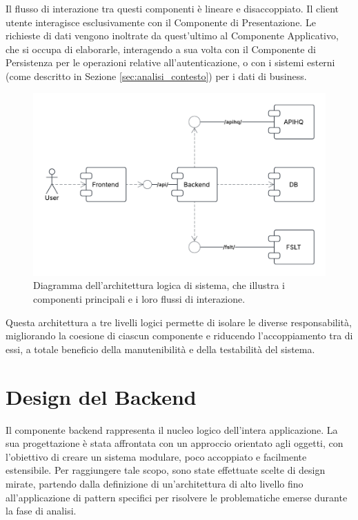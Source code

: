 \documentclass[12pt,a4paper,openright,twoside]{book}
\begin{document}
Il flusso di interazione tra questi componenti è lineare e disaccoppiato. Il client utente interagisce esclusivamente con il Componente di Presentazione. Le richieste di dati vengono inoltrate da quest'ultimo al Componente Applicativo, che si occupa di elaborarle, interagendo a sua volta con il Componente di Persistenza per le operazioni relative all'autenticazione, o con i sistemi esterni (come descritto in Sezione \ref{sec:analisi_contesto}) per i dati di business.


\begin{figure}[H]
    \centering
    \includegraphics[width=\textwidth]{figures/components.pdf}
    \caption{Diagramma dell'architettura logica di sistema, che illustra i componenti principali e i loro flussi di interazione.}
    \label{fig:logical_architecture_diagram}
\end{figure}


Questa architettura a tre livelli logici permette di isolare le diverse responsabilità, migliorando la coesione di ciascun componente e riducendo l'accoppiamento tra di essi, a totale beneficio della manutenibilità e della testabilità del sistema.

\section{Design del Backend}
\label{sec:design_backend_oop}

Il componente backend rappresenta il nucleo logico dell'intera applicazione. La sua progettazione è stata affrontata con un approccio orientato agli oggetti, con l'obiettivo di creare un sistema modulare, poco accoppiato e facilmente estensibile. Per raggiungere tale scopo, sono state effettuate scelte di design mirate, partendo dalla definizione di un'architettura di alto livello fino all'applicazione di pattern specifici per risolvere le problematiche emerse durante la fase di analisi.
\end{document}
